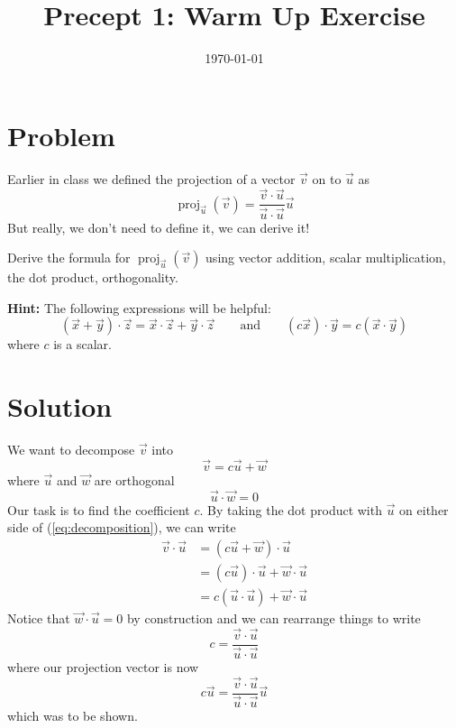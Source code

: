 \documentclass[11pt]{article}
\title{Precept 1: Warm Up Exercise}
\date{\today}
\begin{document}
\maketitle
\thispagestyle{fancy}

\section*{Problem}

Earlier in class we defined the projection of a vector $\vec{v}$ on to $\vec{u}$ as
\begin{equation}
\label{eq:projection}
\operatorname{proj}_{\vec{u}}\left(\vec{v}\right)=\frac{\vec{v}\cdot \vec{u}}{\vec{u}\cdot \vec{u}}\vec{u}
\end{equation}
But really, we don't need to define it, we can derive it!

Derive the formula for $\operatorname{proj}_{\vec{u}}\left(\vec{v}\right)$ using vector addition, scalar multiplication, the dot product, orthogonality.

\noindent\textbf{Hint:} The following expressions will be helpful:
\[
\left(\vec{x}+\vec{y}\right)\cdot \vec{z}=\vec{x}\cdot \vec{z} + \vec{y}\cdot \vec{z} \qquad \text{and} \qquad \left(c\vec{x}\right)\cdot\vec{y}=c\left(\vec{x}\cdot\vec{y}\right)
\]
where $c$ is a scalar.

\section*{Solution}

We want to decompose $\vec{v}$ into
\begin{equation}
\label{eq:decomposition}
\vec{v} = c\vec{u} + \vec{w}
\end{equation}
where $\vec{u}$ and $\vec{w}$ are orthogonal
\[
\vec{u}\cdot \vec{w} = 0
\]
Our task is to find the coefficient $c$. By taking the dot product with $\vec{u}$ on either side of (\ref{eq:decomposition}), we can write
\begin{align*}
\vec{v}\cdot\vec{u} &= \left(c\vec{u} + \vec{w}\right)\cdot \vec{u}\\
&= \left(c\vec{u}\right)\cdot \vec{u} + \vec{w}\cdot \vec{u}\\
&= c\left(\vec{u} \cdot \vec{u}\right) + \vec{w}\cdot \vec{u}
\end{align*}
Notice that $\vec{w}\cdot \vec{u}=0$ by construction and we can rearrange things to write
\[
c=\frac{\vec{v}\cdot\vec{u}}{\vec{u} \cdot \vec{u}}
\]
where our projection vector is now
\[
c\vec{u} = \frac{\vec{v}\cdot\vec{u}}{\vec{u} \cdot \vec{u}}\vec{u}
\]
which was to be shown.
\end{document}
